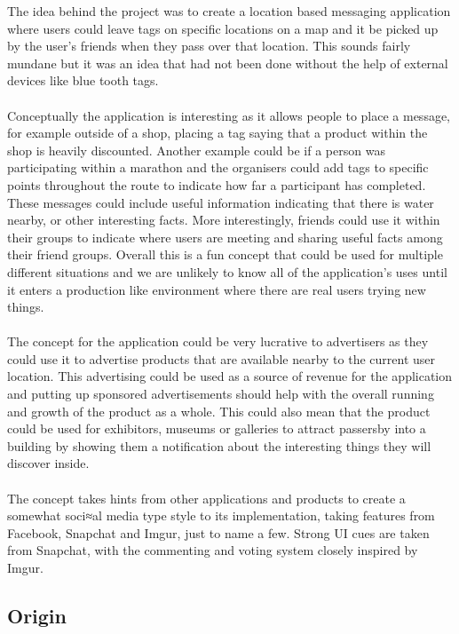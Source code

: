 The idea behind the project was to create a location based messaging application where users could leave tags on specific locations on a map and it be picked up by the user's friends when they pass over that location. This sounds fairly mundane but it was an idea that had not been done without the help of external devices like blue tooth tags.\\
\\
Conceptually the application is interesting as it allows people to place a message, for example outside of a shop, placing a tag saying that a product within the shop is heavily discounted. Another example could be if a person was participating within a marathon and the organisers could add tags to specific points throughout the route to indicate how far a participant has completed. These messages could include useful information indicating that there is water nearby, or other interesting facts. More interestingly, friends could use it within their groups to indicate where users are meeting and sharing useful facts among their friend groups. Overall this is a fun concept that could be used for multiple different situations and we are unlikely to know all of the application's uses until it enters a production like environment where there are real users trying new things.\\
\\
The concept for the application could be very lucrative to advertisers as they could use it to advertise products that are available nearby to the current user location. This advertising could be used as a source of revenue for the application and putting up sponsored advertisements should help with the overall running and growth of the product as a whole. This could also mean that the product could be used for exhibitors, museums or galleries to attract passersby into a building by showing them a notification about the interesting things they will discover inside.\\
\\
The concept takes hints from other applications and products to create a somewhat soci≈al media type style to its implementation, taking features from Facebook, Snapchat and Imgur, just to name a few. Strong UI cues are taken from Snapchat, with the commenting and voting system closely inspired by Imgur.

\subsection{Origin}
\label{sec:origin}

